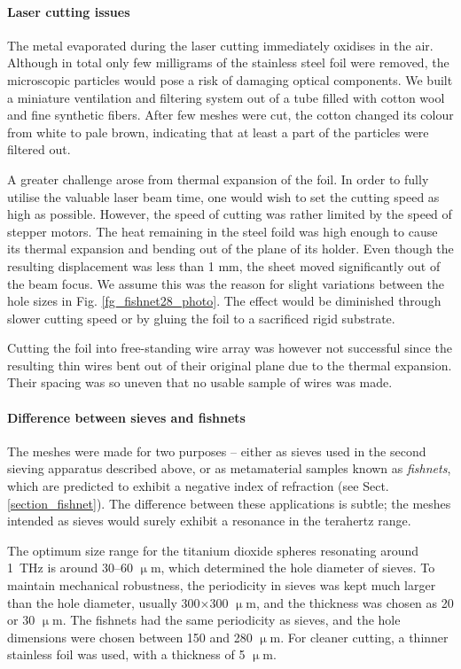 \paragraph{Laser cutting issues}%
The metal evaporated during the laser cutting immediately oxidises in the air. Although in total only few milligrams of the stainless steel foil were removed, the microscopic particles would pose a risk of damaging optical components. We built a miniature ventilation and filtering system out of a tube filled with cotton wool and fine synthetic fibers. After few meshes were cut, the cotton changed its colour from white to pale brown, indicating that at least a part of the particles were filtered out.

A greater challenge arose from thermal expansion of the foil. In order to fully utilise the valuable laser beam time, one would wish to set the cutting speed as high as possible. However, the speed of cutting was rather limited by the speed of stepper motors. The heat remaining in the steel foild was high enough to cause its thermal expansion and bending out of the plane of its holder. Even though the resulting displacement was less than 1 mm, the sheet moved significantly out of the beam focus. We assume this was the reason for slight variations between the hole sizes in Fig. \ref{fg_fishnet28_photo}. The effect would be diminished through slower cutting speed or by gluing the foil to a sacrificed rigid substrate.

Cutting the foil into free-standing wire array was however not successful since the resulting thin wires bent out of their original plane due to the thermal expansion. Their spacing was so uneven that no usable sample of wires was made.

\paragraph{Difference between sieves and fishnets}%
The meshes were made for two purposes -- either as sieves used in the second sieving apparatus described above, or as metamaterial samples known as \textit{fishnets}, which are predicted to exhibit a negative index of refraction (see Sect. \ref{section_fishnet}). The difference between these applications is subtle; the meshes intended as sieves would surely exhibit a resonance in the terahertz range. 

The optimum  size range for the titanium dioxide spheres resonating around 1~THz is around 30--60 $\upmu$m, which determined the hole diameter of sieves. To maintain mechanical robustness, the periodicity in sieves was kept much larger than the hole diameter, usually 300$\times$300 $\upmu$m, and the thickness was chosen as 20 or 30 $\upmu$m.
The fishnets had the same periodicity as sieves, and the hole dimensions were chosen between 150 and 280 $\upmu$m. 
For cleaner cutting, a thinner stainless foil was used, with a thickness of 5 $\upmu$m.

